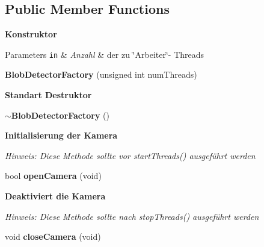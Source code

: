 \subsection*{Public Member Functions}
\begin{Indent}{\bf Konstruktor}\par
{\em 
\begin{DoxyParams}[1]{Parameters}
\mbox{\tt in}  & {\em Anzahl} & der zu \char`\"{}\+Arbeiter\char`\"{}-\/ Threads \\
\hline
\end{DoxyParams}
}\begin{DoxyCompactItemize}
\item 
\hypertarget{classrc_1_1BlobDetectorFactory_ad23d95cfe5c4a4204b5e1fc38c62dc8a}{{\bfseries Blob\+Detector\+Factory} (unsigned int num\+Threads)}\label{classrc_1_1BlobDetectorFactory_ad23d95cfe5c4a4204b5e1fc38c62dc8a}

\end{DoxyCompactItemize}
\end{Indent}
\begin{Indent}{\bf Standart Destruktor}\par
\begin{DoxyCompactItemize}
\item 
\hypertarget{classrc_1_1BlobDetectorFactory_a5532ab9249a1c53c4b87a968be4d6235}{{\bfseries $\sim$\+Blob\+Detector\+Factory} ()}\label{classrc_1_1BlobDetectorFactory_a5532ab9249a1c53c4b87a968be4d6235}

\end{DoxyCompactItemize}
\end{Indent}
\begin{Indent}{\bf Initialisierung der Kamera}\par
{\em Hinweis\+: Diese Methode sollte {\itshape vor} start\+Threads() ausgeführt werden }\begin{DoxyCompactItemize}
\item 
\hypertarget{classrc_1_1BlobDetectorFactory_a8816a3c768cde4d4491f2ab06f875df3}{bool {\bfseries open\+Camera} (void)}\label{classrc_1_1BlobDetectorFactory_a8816a3c768cde4d4491f2ab06f875df3}

\end{DoxyCompactItemize}
\end{Indent}
\begin{Indent}{\bf Deaktiviert die Kamera}\par
{\em Hinweis\+: Diese Methode sollte {\itshape nach} stop\+Threads() ausgeführt werden }\begin{DoxyCompactItemize}
\item 
\hypertarget{classrc_1_1BlobDetectorFactory_a847250d92a85518c9701ab8152c542f5}{void {\bfseries close\+Camera} (void)}\label{classrc_1_1BlobDetectorFactory_a847250d92a85518c9701ab8152c542f5}

\end{DoxyCompactItemize}
\end{Indent}
